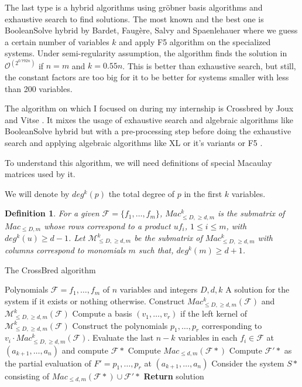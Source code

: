 \documentclass[english]{article}
\newtheorem{definition}{Definition}[section]
\begin{document}
		The last type is a hybrid algorithms using gröbner basis algorithms and exhaustive search to find solutions. The most known and the best one is BooleanSolve hybrid by Bardet, Faugère, Salvy and Spaenlehauer \cite{BFSS13} where we guess a certain number of variables $k$ and apply F5 algorithm on the specialized systems. Under semi-regularity assumption, the algorithm finds the solution in $\mathcal{O}^(2^{0.792n})$ if $n = m$ and $k = 0.55n$. This is better than exhaustive search, but still, the constant factors are too big for it to be better for systems smaller with less than 200 variables.
		
		The algorithm on which I focused on during my internship is Crossbred by Joux and Vitse \cite{JV17}. It mixes the usage of exhaustive search and algebraic algorithms like BooleanSolve hybrid but with a pre-processing step before doing the exhaustive search and applying algebraic algorithms like XL \cite{CKPS00} or it's variants or F5 \cite{F02}.
		
		To understand this algorithm, we will need definitions of special Macaulay matrices used by it.
		
		We will denote by $deg^k(p)$ the total degree of $p$ in the first $k$ variables.
		
		\begin{definition}
			For a given $\mathcal{F} = \{f_1,\dots,f_m\}$, $Mac_{\leq D, \geq d, m}^k$ is the submatrix of $Mac_{\leq D, m}$ whose rows correspond to a product $uf_i$, $1 \leq i \leq m$, with $deg^k(u) \geq d-1$. Let $\mathcal{M}_{\leq D, \geq d, m}^k$ be the submatrix of $Mac_{\leq D, \geq d, m}^k$ with columns correspond to monomials $m$ such that, $deg^k(m) \geq d+1$.
		\end{definition}
		
		\begin{algorithm}
			\caption{The CrossBred algorithm}\label{alg:crossbred}
			\begin{algorithmic}[1]
				\Require Polynomials $\mathcal{F} = {f_1, \dots, f_m}$ of $n$ variables and integers $D,d,k$
				\Ensure  A solution for the system if it exists or nothing otherwise.
				\State Construct $Mac_{\leq D, \geq d, m}^k(\mathcal{F})$ and $\mathcal{M}_{\leq D, \geq d, m}^k(\mathcal{F})$
				\State Compute a basis $(v_1,\dots,v_r)$ if the left kernel of $\mathcal{M}_{\leq D, \geq d, m}^k(\mathcal{F})$
				\State Construct the polynomials $p_1,\dots,p_r$ corresponding to $v_i \cdot Mac_{\leq D, \geq d, m}^k(\mathcal{F})$.
				\State Evaluate the last $n-k$ variables in each $f_i \in \mathcal{F}$ at $(a_{k+1},\dots,a_n)$ and compute $\mathcal{F}*$
				\State Compute $Mac_{\leq d, m}(\mathcal{F}*)$
				\State Compute $\mathcal{F}'*$ as the partial evaluation of $F' = {p_1,\dots,p_r}$ at $(a_{k+1},\dots,a_n)$
				\State Consider the system $S*$ consisting of $Mac_{\leq d, m}(\mathcal{F}*) \cup \mathcal{F}'*$
				\State \textbf{Return} solution
				\EndIf
				\EndFor
			\end{algorithmic}
		\end{algorithm}
		
\end{document}
